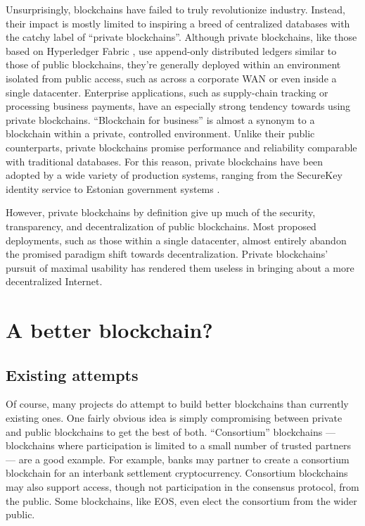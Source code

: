 \documentclass[headinclude]{scrbook}
\begin{document}
Unsurprisingly, blockchains have failed to truly revolutionize industry. Instead, their  impact is mostly limited to inspiring a breed of centralized databases with the catchy label of ``private blockchains''. Although private blockchains, like those based on Hyperledger Fabric \cite{cachin2016architecture}, use append-only distributed ledgers similar to those of public blockchains, they're generally deployed within an environment isolated from public access, such as across a corporate WAN or even inside a single datacenter. Enterprise applications, such as supply-chain tracking or processing business payments, have an especially strong tendency towards using private blockchains. ``Blockchain for business'' is almost a synonym to a blockchain within a private, controlled environment. Unlike their public counterparts, private blockchains promise performance and reliability comparable with traditional databases. For this reason, private blockchains have been adopted by a wide variety of production systems, ranging from the SecureKey identity service \cite{securekey} to Estonian government systems \cite{estonia}.

However, private blockchains by definition give up much of the security, transparency, and decentralization of public blockchains. Most proposed deployments, such as those within a single datacenter, almost entirely abandon the promised paradigm shift towards decentralization. Private blockchains' pursuit of maximal usability has rendered them useless in bringing about a more decentralized Internet.

\section{A better blockchain?}

\subsection{Existing attempts}

Of course, many projects do attempt to build better blockchains than currently existing ones. One fairly obvious idea is simply compromising between private and public blockchains to get the best of both. ``Consortium'' blockchains --- blockchains where participation is limited to a small number of trusted partners --- are a good example. For example, banks may partner to create a consortium blockchain for an interbank settlement cryptocurrency. Consortium blockchains may also support access, though not participation in the consensus protocol, from the public. Some blockchains, like EOS, even elect the consortium from the wider public.
\end{document}

